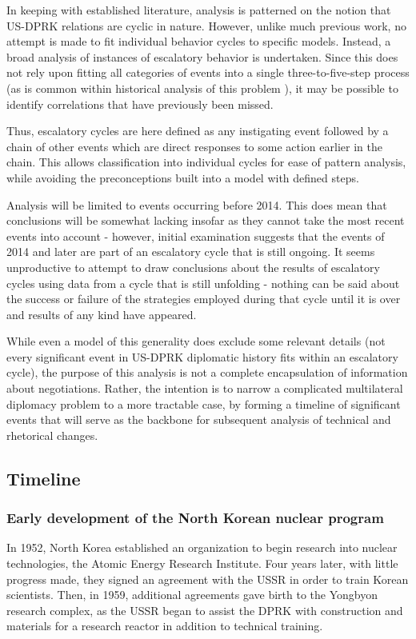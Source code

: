 \documentclass{article}
\begin{document}
In keeping with established literature, analysis is patterned on the notion that US-DPRK relations are cyclic in nature. However, unlike much previous work, no attempt is made to fit individual behavior cycles to specific models. Instead, a broad analysis of instances of escalatory behavior is undertaken. Since this does not rely upon fitting all categories of events into a single three-to-five-step process (as is common within historical analysis of this problem \cite{fisher, jun}), it may be possible to identify correlations that have previously been missed.

Thus, escalatory cycles are here defined as any instigating event followed by a chain of other events which are direct responses to some action earlier in the chain. This allows classification into individual cycles for ease of pattern analysis, while avoiding the preconceptions built into a model with defined steps.

Analysis will be limited to events occurring before 2014. This does mean that conclusions will be somewhat lacking insofar as they cannot take the most recent events into account - however, initial examination suggests that the events of 2014 and later are part of an escalatory cycle that is still ongoing. It seems unproductive to attempt to draw conclusions about the results of escalatory cycles using data from a cycle that is still unfolding - nothing can be said about the success or failure of the strategies employed during that cycle until it is over and results of any kind have appeared.

While even a model of this generality does exclude some relevant details (not every significant event in US-DPRK diplomatic history fits within an escalatory cycle), the purpose of this analysis is not a complete encapsulation of information about negotiations. Rather, the intention is to narrow a complicated multilateral diplomacy problem to a more tractable case, by forming a timeline of significant events that will serve as the backbone for subsequent analysis of technical and rhetorical changes.

\subsection{Timeline}
\subsubsection{Early development of the North Korean nuclear program}
In 1952, North Korea established an organization to begin research into nuclear technologies, the Atomic Energy Research Institute\cite{ntiAERI}. Four years later, with little progress made, they signed an agreement with the USSR in order to train Korean scientists\cite{nti15}. Then, in 1959, additional agreements gave birth to the Yongbyon research complex, as the USSR began to assist the DPRK with construction and materials for a research reactor in addition to technical training\cite{nti15}.
\end{document}
